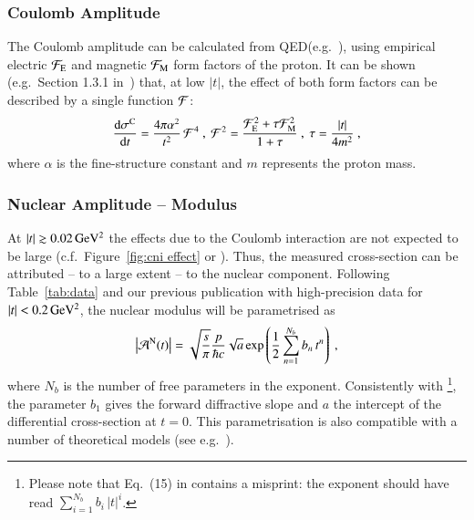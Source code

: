 \subsubsection{Coulomb Amplitude}
\label{sec:cni coulomb}
%
The Coulomb amplitude can be calculated from QED\Break (e.g.~\cite{block96}), using empirical electric ${\cal F}_{\rm E}$ and magnetic ${\cal F}_{\rm M}$ form factors of the proton. It can be shown (e.g.~Section 1.3.1 in~\cite{jan_thesis}) that, at low $|t|$, the effect of both form factors can be described by a single function ${\cal F}$:
\begin{equation}
\label{eq:coul cs}
	{\d\sigma^{\rm C}\over \d t} = {4\pi\alpha^2\over t^2}\,{\cal F}^4\ ,\ 
	{\cal F}^2 = {{\cal F}_{\rm E}^2 + \tau {\cal F}_{\rm M}^2\over 1 + \tau}\ ,\ 
	\tau = {|t|\over 4m^2}\ ,
\end{equation}
where $\alpha$ is the fine-structure constant and $m$ represents the proton mass.



\subsubsection{Nuclear Amplitude -- Modulus}
\label{sec:cni nuclear modulus}

At $|t| \gtrsim 0.02\,{\rm GeV^2}$ the effects due to the Coulomb interaction are not expected to be large (c.f.~Figure~\ref{fig:cni effect} or \cite{kklp11}). Thus, the measured cross-section can be attributed -- to a large extent -- to the nuclear component. Following Table~\ref{tab:data} and our previous publication \cite{8tev-90m} with high-precision data for $|t| < 0.2\,{\rm GeV^2}$, the nuclear modulus will be parametrised as
\begin{equation}
\label{eq:nuc mod}
\left | {\cal A}^{\rm N}(t) \right | = \sqrt{s\over\pi} {p\over \hbar c} \sqrt{a} \exp\left( {1\over 2} \sum\limits_{n = 1}^{N_b} b_n\, t^n \right)\ ,
\end{equation}
where $N_b$ is the number of free parameters in the exponent. Consistently with \cite{8tev-90m} \footnote{%
Please note that Eq.~(15) in \cite{8tev-90m} contains a misprint: the exponent should have read $\sum\limits_{i=1}^{N_b} b_i\, |t|^i$.
}, the parameter $b_1$ gives the forward diffractive slope and $a$ the intercept of the differential cross-section at $t=0$. This parametrisation is also compatible with a number of theoretical models (see e.g.~\cite{elegent}).

